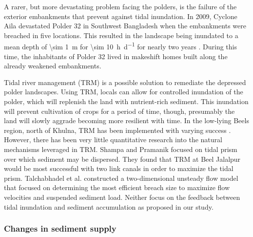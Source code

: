 \documentclass[12pt]{article}
\begin{document}
A rarer, but more devastating problem facing the polders, is the failure of the exterior embankments that prevent against tidal inundation. In 2009, Cyclone Aila devastated Polder 32 in Southwest Bangladesh when the embankments were breached in five locations. This resulted in the landscape being inundated to a mean depth of \SI{\sim 1}{\meter} for \SI{\sim 10}{\hour\per\day} for nearly two years \cite{auerbachFloodRiskNatural2015}. During this time, the inhabitants of Polder 32 lived in makeshift homes built along the already weakened embankments.

Tidal river management (TRM) is a possible solution to remediate the depressed polder landscapes. Using TRM, locals can allow for controlled inundation of the polder, which will replenish the land with nutrient-rich sediment. This inundation will prevent cultivation of crops for a period of time, though, presumably the land will slowly aggrade becoming more resilient with time. In the low-lying Beels region, north of Khulna, TRM has been implemented with varying success \cite{khadimIntegratedWaterResources2013a, shampaTidalRiverManagement2012, vanstaverenBringingTidesClosing2017}. However, there has been very little quantitative research into the natural mechanisms leveraged in TRM. Shampa and Pramanik \cite{shampaTidalRiverManagement2012} focused on tidal prism over which sediment may be dispersed. They found that TRM at Beel Jalalpur would be most successful with two link canals in order to maximize the tidal prism. Talchabhadel et al. \cite{talchabhadelExperimentalStudyTidal2017} constructed a two-dimensional unsteady flow model that focused on determining the most efficient breach size to maximize flow velocities and suspended sediment load. Neither focus on the feedback between tidal inundation and sediment accumulation as proposed in our study.

\subsubsection*{Changes in sediment supply}
\end{document}
